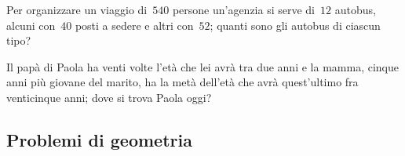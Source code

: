 \begin{multicols}{2}
\begin{esercizio}[\Ast, \croce]
Per organizzare un viaggio di~$540$ persone un'agenzia si serve di~$12$ autobus, alcuni con~$40$ posti a sedere e altri con~$52$; quanti sono gli autobus di ciascun tipo?
\end{esercizio}

\begin{esercizio}[\croce]
Il papà di Paola ha venti volte l'età che lei avrà tra due anni e la mamma, cinque anni più giovane del marito, ha la metà dell'età che avrà quest'ultimo fra venticinque anni; dove si trova Paola oggi?
\end{esercizio}
\end{multicols}
\subsection{Problemi di geometria}
